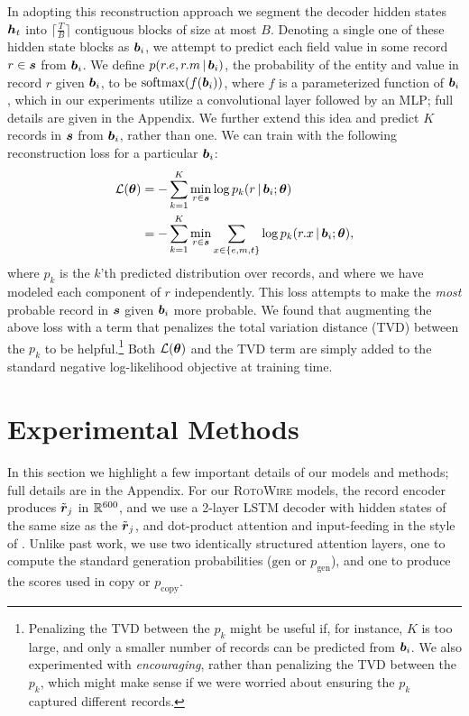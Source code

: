 \documentclass[11pt,letterpaper]{article}
\begin{document}
In adopting this reconstruction approach we 
segment the decoder hidden states $\boldsymbol{h}_t$ into
$\lceil \frac{T}{B} \rceil$ contiguous blocks of size at most
$B$. Denoting a single one of these hidden state blocks as $\boldsymbol{b}_i$,
we attempt to predict each field value in some record
$r \in \boldsymbol{s}$ from $\boldsymbol{b}_i$. We define
$p(r.e, r.m \,|\, \boldsymbol{b}_i)$, the probability of the entity and value in record $r$ given $\boldsymbol{b}_i$, to be
$\mathrm{softmax}(f(\boldsymbol{b}_i))$, where $f$ is a parameterized function of
$\boldsymbol{b}_i$, which in our experiments utilize a convolutional layer
followed by an MLP; full details are given in the Appendix. We further extend this
idea and predict $K$ records in $\boldsymbol{s}$ from $\boldsymbol{b}_i$,
rather than one. We can train with the following reconstruction loss for a particular $\boldsymbol{b}_i$:
\begin{align*}
\mathcal{L}(\boldsymbol{\theta}) &= -\sum_{k=1}^K \min_{r \in \boldsymbol{s}}  \log p_k(r \,|\, \boldsymbol{b}_i; \boldsymbol{\theta}) \\
&= -\sum_{k=1}^K \min_{r \in \boldsymbol{s}}  \sum_{x \in \{e, m, t\}} \log p_k(r.x \,|\, \boldsymbol{b}_i; \boldsymbol{\theta}) ,
\end{align*}
where $p_k$ is the $k$'th predicted distribution over records, and where we have modeled each component of $r$ independently. This loss attempts to make the \textit{most} probable record in $\boldsymbol{s}$ given $\boldsymbol{b}_i$ more probable. We found that augmenting the above loss with a term that penalizes the total variation distance (TVD) between the $p_k$ to be helpful.\footnote{Penalizing the TVD between the $p_k$ might be useful if, for instance, $K$ is too large, and only a smaller number of records can be predicted from $\boldsymbol{b}_i$. We also experimented with \textit{encouraging}, rather than penalizing the TVD between the $p_k$, which might make sense if we were worried about ensuring the $p_k$ captured different records. 
} Both $\mathcal{L}(\boldsymbol{\theta})$ and the TVD term are simply added to the standard negative log-likelihood objective at training time.


\section{Experimental Methods}

In this section we highlight a few important details of our models and methods; full details are in the Appendix. For our \textsc{RotoWire} models, the record encoder produces $\tilde{\boldsymbol{r}}_j$ in $\mathbb{R}^{600}$, and we use a 2-layer LSTM
decoder with hidden states of the same size as the $\tilde{\boldsymbol{r}}_j$,
and dot-product attention and input-feeding in the style of
\citet{luong2015effective}. Unlike past work, we use two identically structured
attention layers, one to compute the standard generation probabilities ($\mathrm{gen}$ or $p_{\mathrm{gen}}$), and one to produce the scores used in 
$\mathrm{copy}$ or $p_{\mathrm{copy}}$. 
\end{document}
